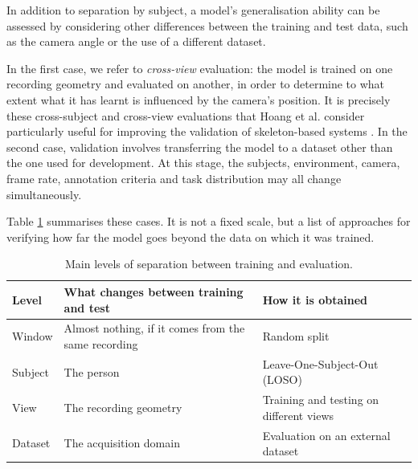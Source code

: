 In addition to separation by subject, a model's generalisation ability can be assessed by considering other differences between the training and test data, such as the camera angle or the use of a different dataset.

In the first case, we refer to \emph{cross-view} evaluation: the model is trained on one recording geometry and evaluated on another, in order to determine to what extent what it has learnt is influenced by the camera's position. It is precisely these cross-subject and cross-view evaluations that Hoang et al. consider particularly useful for improving the validation of skeleton-based systems \cite{HO}.
In the second case, validation involves transferring the model to a dataset other than the one used for development. At this stage, the subjects, environment, camera, frame rate, annotation criteria and task distribution may all change simultaneously.

Table \ref{tab:generalizzazione} summarises these cases. It is not a fixed scale, but a list of approaches for verifying how far the model goes beyond the data on which it was trained.

\begin{table}[htbp]
\centering
\caption{Main levels of separation between training and evaluation.}
\label{tab:generalizzazione}

\renewcommand{\arraystretch}{1.2}

\begin{tabularx}{\textwidth}{
@{}
>{\centering\arraybackslash}p{}
>{\hsize=1.2\hsize\centering\arraybackslash}X
>{\hsize=0.8\hsize\centering\arraybackslash}X
@{}
}
\toprule

\textbf{Level} &
\textbf{What changes between training and test} &
\textbf{How it is obtained} \\

\midrule

Window
& Almost nothing, if it comes from the same recording
& Random split \\

Subject
& The person
& Leave-One-Subject-Out (LOSO) \\

View
& The recording geometry
& Training and testing on different views \\

Dataset
& The acquisition domain
& Evaluation on an external dataset \\

\bottomrule
\end{tabularx}

\end{table}


